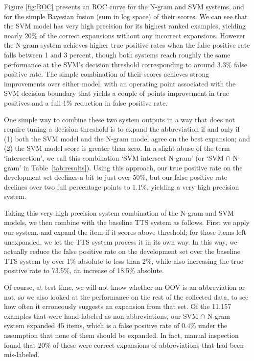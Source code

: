 \documentclass[11pt]{article}
\begin{document}
Figure \ref{fig:ROC} presents an ROC curve for the N-gram and SVM
systems, and for the simple Bayesian fusion (sum in log space) of
their scores.  We can see that the SVM model has very high precision
for its highest ranked examples, yielding nearly 20\% of the correct
expansions without any incorrect expansions.  However the N-gram
system achieves higher true positive rates when the false positive
rate falls between 1 and 3 percent, though both systems reach roughly the same
performance at the SVM's decision threshold corresponding to around 3.3\% false
positive rate.  The simple combination of their scores achieves 
strong improvements over either model, with an operating point
associated with the SVM decision boundary that yields a couple of
points improvement in true positives and a full 1\% reduction in false
positive rate.  

One simple way to combine these two system outputs in a way that does not
require tuning a decision threshold is to expand the abbreviation if and only if
(1) both the SVM model and the N-gram model agree on the best expansion; and (2)
the SVM model score is greater than zero. In a slight abuse of the term
`intersection', we call this combination `SVM intersect N-gram' (or `SVM $\cap$
N-gram' in Table~\ref{tab:results}). Using this approach, our true positive rate
on the development set declines a bit to just over 50\%, but our false positive rate
declines over two full percentage points to 1.1\%, yielding a very high
precision system.

Taking this very high precision system combination of the N-gram and
SVM models, we then combine with the baseline TTS system as follows.
First we apply our system, and expand the item if it scores above
threshold; for those items left unexpanded, we let the TTS system
process it in its own way. In this way, we actually reduce the false
positive rate on the development set over the baseline TTS system by over
1\% absolute to less than 2\%, while also increasing the true positive
rate to 73.5\%, an increase of 18.5\% absolute.

Of course, at test time, we will not know whether an OOV is an
abbreviation or not, so we also looked at the performance on the rest
of the collected data, to see how often it erroneously suggests an
expansion from that set. Of the 11,157 examples that were hand-labeled
as non-abbreviations, our SVM $\cap$ N-gram system expanded
45 items, which is a false positive rate of 0.4\% under the assumption
that none of them should be expanded. In fact, manual inspection found 
that 20\% of these were correct expansions of abbreviations that
had been mis-labeled.
\end{document}
